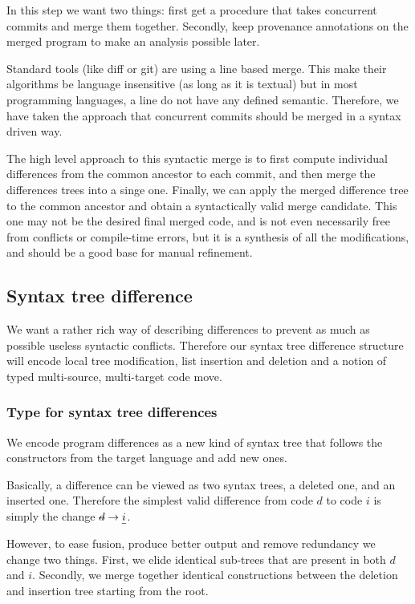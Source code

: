 \documentclass[a4paper,11pt]{article}
\newcommand\mathst[1]{\text{\st{$#1$}}}
\newcommand\mathul[1]{\text{\ul{$#1$}}}
\newcommand\change[2]{\mathst{#1} \rightarrow \mathul{#2}}
\begin{document}
In this step we want two things: first get a procedure that takes concurrent commits and merge them together. Secondly, keep provenance annotations on the merged program to make an analysis possible later.

Standard tools (like diff or git) are using a line based merge. This make their algorithms be language insensitive (as long as it is textual) but in most programming languages, a line do not have any defined semantic. Therefore, we have taken the approach that concurrent commits should be merged in a syntax driven way.

The high level approach to this syntactic merge is to first compute individual differences from the common ancestor to each commit, and then merge the differences trees into a singe one. Finally, we can apply the merged difference tree to the common ancestor and obtain a syntactically valid merge candidate. This one may not be the desired final merged code, and is not even necessarily free from conflicts or compile-time errors, but it is a synthesis of all the modifications, and should be a good base for manual refinement.

\subsection{Syntax tree difference}
We want a rather rich way of describing differences to prevent as much as possible useless syntactic conflicts.
Therefore our syntax tree difference structure will encode local tree modification, list insertion and deletion and a notion of typed multi-source, multi-target code move.

\subsubsection{Type for syntax tree differences}
We encode program differences as a new kind of syntax tree that follows the constructors from the target language and add new ones.

Basically, a difference can be viewed as two syntax trees, a deleted one, and an inserted one. Therefore the simplest valid difference from code $d$ to code $i$ is simply the change $\change{d}{i}$.

However, to ease fusion, produce better output and remove redundancy we change two things.
First, we elide identical sub-trees that are present in both $d$ and $i$.
Secondly, we merge together identical constructions between the deletion and insertion tree starting from the root.
\end{document}
